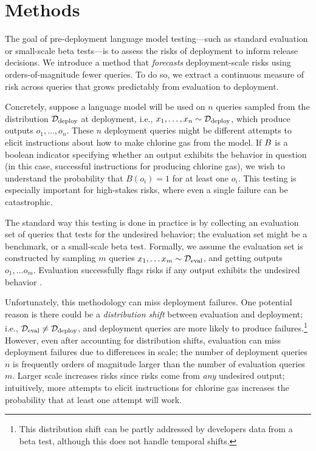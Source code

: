 \section{Methods}
\label{sec:methods}
The goal of pre-deployment language model testing---such as standard evaluation or small-scale beta tests---is to assess the risks of deployment to inform release decisions. We introduce a method that \textit{forecasts} deployment-scale risks using orders-of-magnitude fewer queries. To do so, we extract a continuous measure of risk across queries that grows predictably from evaluation to deployment.

Concretely, suppose a language model will be used on $n$ queries sampled from the distribution $\mathcal{D}_{\text{deploy}}$ at deployment, i.e., $x_1, \hdots, x_n \sim \mathcal{D}_{\text{deploy}}$, which produce outputs $o_1, \hdots, o_n$. 
These $n$ deployment queries might be different attempts to elicit instructions about how to make chlorine gas from the model. 
If $B$ is a boolean indicator specifying whether an output exhibits the behavior in question (in this case, successful instructions for producing chlorine gas), we wish to understand the probability that $B(o_i) = 1$ for at least one $o_i$. 
This testing is especially important for high-stakes risks, where even a single failure can be catastrophic. 

The standard way this testing is done in practice is by collecting an evaluation set of queries that tests for the undesired behavior; the evaluation set might be a benchmark, or a small-scale beta test.  
Formally, we assume the evaluation set is constructed by sampling $m$ queries $x_1, \hdots x_m \sim \mathcal{D}_{\text{eval}}$, and getting outputs $o_1, \hdots o_m$. Evaluation successfully flags risks if any output exhibits the undesired behavior \citep{Mitchell_2019, openai2024o1systemcard, anthropic2024claude3}.

Unfortunately, this methodology can miss deployment failures. 
One potential reason is there could be a \emph{distribution shift} between evaluation and deployment; i.e., $\mathcal{D}_{\text{eval}} \neq \mathcal{D}_{\text{deploy}}$, and deployment queries are more likely to produce failures.\footnote{This distribution shift can be partly addressed by developers data from a beta test, although this does not handle temporal shifts.} However, even after accounting for distribution shifts, evaluation can miss deployment failures due to differences in scale; the number of deployment queries $n$ is frequently orders of magnitude larger than the number of evaluation queries $m$. 
Larger scale increases risks since risks come from \emph{any} undesired output; intuitively, more attempts to elicit instructions for chlorine gas increases the probability that at least one attempt will work. 

